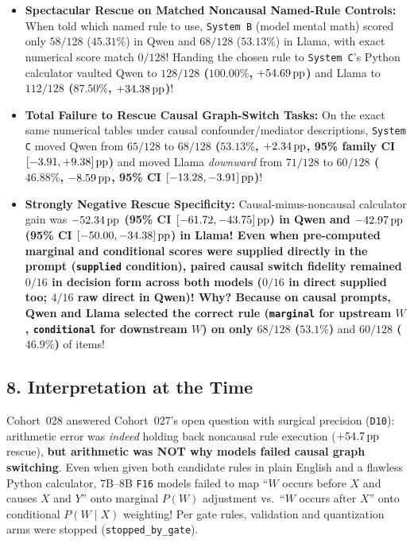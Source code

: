 

\begin{itemize}
  \item \textbf{Spectacular Rescue on Matched Noncausal Named-Rule Controls:} When told which named rule to use, \texttt{System B} (model mental math) scored only $58/128$ ($45.31\%$) in Qwen and $68/128$ ($53.13\%$) in Llama, with exact numerical score match $0/128$! Handing the chosen rule to \texttt{System C}'s Python calculator vaulted Qwen to \textbf{$128/128$ ($100.00\%$, $+54.69\,\mathrm{pp}$)} and Llama to \textbf{$112/128$ ($87.50\%$, $+34.38\,\mathrm{pp}$)}!
  \item \textbf{Total Failure to Rescue Causal Graph-Switch Tasks:} On the exact same numerical tables under causal confounder/mediator descriptions, \texttt{System C} moved Qwen from $65/128$ to \textbf{$68/128$ ($53.13\%$, $+2.34\,\mathrm{pp}$, 95\% family CI $[-3.91, +9.38]\,\mathrm{pp}$)} and moved Llama \emph{downward} from $71/128$ to \textbf{$60/128$ ($46.88\%$, $-8.59\,\mathrm{pp}$, 95\% CI $[-13.28, -3.91]\,\mathrm{pp}$)}!
  \item \textbf{Strongly Negative Rescue Specificity:} Causal-minus-noncausal calculator gain was \textbf{$-52.34\,\mathrm{pp}$\textbf{ (95\% CI $[-61.72, -43.75]\,\mathrm{pp}$) in Qwen and }$-42.97\,\mathrm{pp}$\textbf{ (95\% CI $[-50.00, -34.38]\,\mathrm{pp}$) in Llama! Even when pre-computed marginal and conditional scores were supplied directly in the prompt (\texttt{supplied} condition), paired causal switch fidelity remained }$0/16$\textbf{ in decision form across both models ($0/16$ in direct supplied too; $4/16$ raw direct in Qwen)! Why? Because on causal prompts, Qwen and Llama selected the correct rule (\texttt{marginal} for upstream $W$, \texttt{conditional} for downstream $W$) on only }$68/128$ ($53.1\%$)} and \textbf{$60/128$ ($46.9\%$)} of items!
\end{itemize}

\subsection*{8. Interpretation at the Time}
Cohort~028 answered Cohort~027's open question with surgical precision (\texttt{D10}): arithmetic error was \emph{indeed} holding back noncausal rule execution ($+54.7\,\mathrm{pp}$ rescue), \textbf{but arithmetic was NOT why models failed causal graph switching}. Even when given both candidate rules in plain English and a flawless Python calculator, 7B--8B \texttt{F16} models failed to map ``$W$ occurs before $X$ and causes $X$ and $Y$'' onto marginal $P(W)$ adjustment vs.\ ``$W$ occurs after $X$'' onto conditional $P(W\mid X)$ weighting! Per gate rules, validation and quantization arms were stopped (\texttt{stopped\_by\_gate}).

